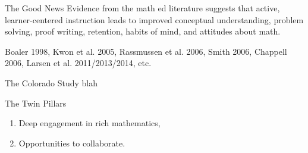 \documentclass[10pt,handout]{beamer}
\begin{document}

\begin{frame}

\begin{block}{The Good News}
Evidence from the math ed literature suggests that active, learner-centered instruction leads to improved conceptual understanding, problem solving, proof writing, retention, habits of mind, and attitudes about math.

\vspace{1em}

Boaler 1998, Kwon et al. 2005, Rassmussen et al. 2006, Smith 2006, Chappell 2006, Larsen et al. 2011/2013/2014, etc.

\end{block}

\end{frame}


\begin{frame}

\begin{block}{The Colorado Study}
blah
\end{block}

\end{frame}


\begin{frame}

\begin{block}{The Twin Pillars}
\begin{enumerate}
\item Deep engagement in rich mathematics,
\item Opportunities to collaborate.
\end{enumerate}

\end{block}

\end{frame}

\end{document}
